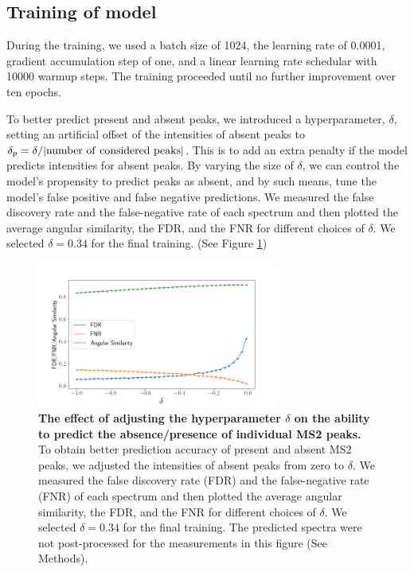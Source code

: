 \documentclass[10pt,a4paper]{article}
\begin{document}
\subsection*{Training of model}

During the training, we used a batch size of 1024, the learning rate of 0.0001, gradient accumulation step of one, and a linear learning rate schedular with 10000 warmup steps. The training proceeded until no further improvement over ten epochs.

To better predict present and absent peaks, we introduced a hyperparameter, $\delta$, setting an artificial offset of the intensities of absent peaks to $\delta_p =\delta / |\rm{number\ of\ considered\ peaks}|$. This is to add an extra penalty if the model predicts intensities for absent peaks. By varying the size of $\delta$, we can control the model’s propensity to predict peaks as absent, and by such means, tune the model’s false positive and false negative predictions. We measured the false discovery rate and the false-negative rate of each spectrum and then plotted the average angular similarity, the FDR, and the FNR for different choices of $\delta$. We selected $\delta=0.34$ for the final training. (See Figure \ref{fig:delta})


\begin{figure}[htb]
\centering
\includegraphics[width=8cm]{./img/compare_delta.png}
\caption{{\bf The effect of adjusting the hyperparameter $\delta$ on the ability to predict the absence/presence of individual MS2 peaks.} To obtain better prediction accuracy of present and absent MS2 peaks, we adjusted the intensities of absent peaks from zero to $\delta$. We measured the false discovery rate (FDR) and the false-negative rate (FNR) of each spectrum and then plotted the average angular similarity, the FDR, and the FNR for different choices of $\delta$. We selected $\delta=0.34$ for the final training.  The predicted spectra were not post-processed for the measurements in this figure (See Methods). \label{fig:delta}}
\end{figure}
\end{document}
